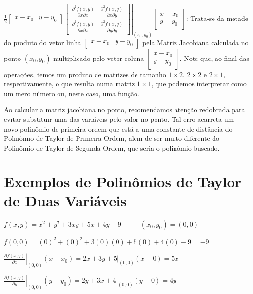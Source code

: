 \documentclass[
  portuguese,
  letterpaper,
  DIV=11,
  numbers=noendperiod]{scrreport}
\begin{document}
\(\frac{1}{2} \begin{bmatrix} x-x_0 & y-y_0 \end{bmatrix}
\left. \begin{bmatrix} \frac{\partial^2 f(x,y)}{\partial x\partial x} & \frac{\partial^2 f(x,y)}{\partial x\partial y}\\
                \frac{\partial^2 f(x,y)}{\partial x \partial x} & \frac{\partial^2 f(x,y)}{\partial y\partial y} \end{bmatrix}\right |_{(x_0,y_0)}
\begin{bmatrix} x-x_0 \\ y-y_0 \end{bmatrix}\): Trata-se da metade do
produto do vetor linha \(\begin{bmatrix} x-x_0 & y-y_0 \end{bmatrix}\)
pela Matriz Jacobiana calculada no ponto \((x_0, y_0)\) multiplicado
pelo vetor coluna \(\begin{bmatrix} x-x_0 \\ y-y_0 \end{bmatrix}\). Note
que, ao final das operações, temos um produto de matrizes de tamanho
\(1 \times 2\), \(2 \times 2\) e \(2 \times 1\), respectivamente, o que
resulta numa matriz \(1 \times 1\), que podemos interpretar como um mero
número ou, neste caso, uma função.

Ao calcular a matriz jacobiana no ponto, recomendamos atenção redobrada
para evitar substituir uma das variáveis pelo valor no ponto. Tal erro
acarreta um novo polinômio de primeira ordem que está a uma constante de
distância do Polinômio de Taylor de Primeira Ordem, além de ser muito
diferente do Polinômio de Taylor de Segunda Ordem, que seria o polinômio
buscado.

\section{Exemplos de Polinômios de Taylor de Duas
Variáveis}\label{exemplos-de-polinuxf4mios-de-taylor-de-duas-variuxe1veis}

\(f(x,y) = x^2+y^2+3xy+5x+4y-9 \phantom{---} (x_0,y_0) = (0,0)\)

\(f(0,0) = (0)^2+(0)^2+3(0)(0)+5(0)+4(0)-9=-9\)

\(\left. \frac{\partial f(x,y)}{\partial x} \right |_{(0,0)} (x-x_0) = \left. 2x+3y+5 \right |_{(0,0)}(x-0)=5x\)

\(\left. \frac{\partial f(x,y)}{\partial y} \right |_{(0,0)} (y-y_0) = \left. 2y+3x+4 \right |_{(0,0)}(y-0)=4y\)
\end{document}
